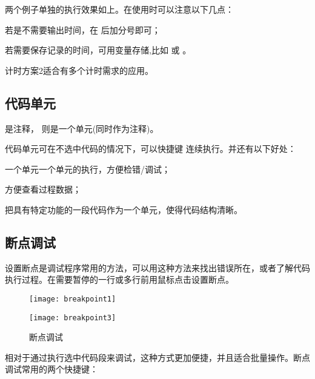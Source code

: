 两个例子单独的执行效果如上。在使用时可以注意以下几点：

\begindot
  \item 若是不需要输出时间，在  后加分号即可；
  \item 若需要保存记录的时间，可用变量存储,比如  或 。
  \item 计时方案2适合有多个计时需求的应用。
\myenddot






\subsection{代码单元}

\mcode{\%} 是注释，\mcode{\%\%} 则是一个单元(同时作为注释)。

\vspace{-0.8cm}


代码单元可在不选中代码的情况下，可以快捷键  连续执行。并还有以下好处：

\begindot
  \item 一个单元一个单元的执行，方便检错/调试；
  \item 方便查看过程数据；
  \item 把具有特定功能的一段代码作为一个单元，使得代码结构清晰。
\myenddot





\subsection{断点调试}

设置断点是调试程序常用的方法，可以用这种方法来找出错误所在，或者了解代码执行过程。在需要暂停的一行或多行前用鼠标点击设置断点。

\begin{figure}[htbp]
  \texttt{[image: breakpoint1]}
\end{figure}

\begin{figure}[htbp]
  \texttt{[image: breakpoint3]}
  \caption{断点调试}
\end{figure}

相对于通过执行选中代码段来调试，这种方式更加便捷，并且适合批量操作。断点调试常用的两个快捷键：

